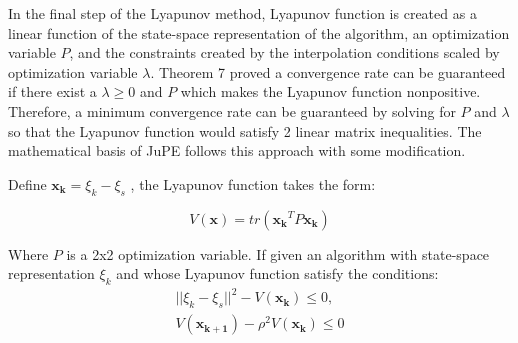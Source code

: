 In the final step of the Lyapunov method, Lyapunov function is created as a linear function of the state-space representation of the algorithm, an optimization variable $P$, and the constraints created by the interpolation conditions scaled by optimization variable $\lambda$. Theorem 7  proved a convergence rate can be guaranteed if there exist a $\lambda \geq 0$ and $P$ which makes the Lyapunov function nonpositive. Therefore, a minimum convergence rate can be guaranteed by solving for $P$ and $\lambda$ so that the Lyapunov function would satisfy 2 linear matrix inequalities. The mathematical basis of JuPE follows this approach with some modification. 

Define $\mathbf{x_k} = \xi _k - \xi _s $ , the Lyapunov function takes the form:

\begin{equation}
	V(\mathbf{x}) = tr(\mathbf{x_k}^TP\mathbf{x_k}) \label{eqn:Lyapunov}
\end{equation}

 Where $P$ is a 2x2  optimization variable. If given an algorithm with state-space representation $\xi _k$ and whose Lyapunov function satisfy the conditions:
\begin{subequations} \label{eqn:Ly_ineq}
	\begin{align}
	  ||\xi _k - \xi _s||^2 - V(\mathbf{x_k}) \leq 0,      \\
	  V(\mathbf{x_{k+1}}) - \rho ^2V(\mathbf{x_k}) \leq 0
	\end{align}
\end{subequations}

